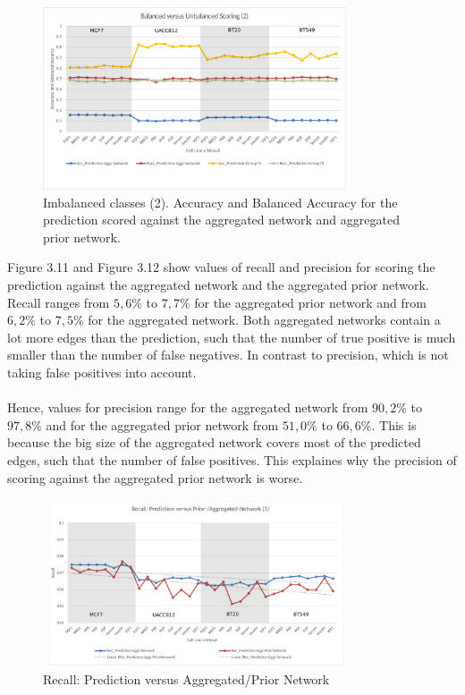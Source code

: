 \begin{figure}[H]
\captionsetup{width=0.8\linewidth}
\centering
\includegraphics[width=0.8\textwidth]{./Bilder/Scoring/dreamchallenge/1_Balanced_vs_Unbalanced/balanced2.pdf}
\caption[Imbalanced classes (2)]{Imbalanced classes (2). Accuracy and Balanced Accuracy for the prediction scored against the aggregated network and aggregated prior network.}
\label{fig:10}
\end{figure}

Figure 3.11 and Figure 3.12 show values of recall and precision for scoring the prediction against the aggregated network and the aggregated prior network. Recall ranges from $5,6\% $ to $7,7\% $ for the aggregated prior network and from $6,2\% $ to $7,5\% $ for the aggregated network. Both aggregated networks contain a lot more edges than the prediction, such that the number of true positive is much smaller than the number of false negatives. In contrast to precision, which is not taking false positives into account. \\\\

Hence, values for precision range for the aggregated network from $90,2\% $ to $97,8\% $ and for the aggregated prior network from $51,0\% $ to $66,6\% $. This is because the big size of the aggregated network covers most of the predicted edges, such that the number of false positives. This explaines why the precision of scoring against the aggregated prior network is worse. 

\begin{figure}[H]
\captionsetup{width=0.8\linewidth}
\centering
\includegraphics[width=0.8\textwidth]{./Bilder/Scoring/dreamchallenge/1_Balanced_vs_Unbalanced/balanced_rec_prec1.pdf}
\caption[Recall: Prediction versus Aggregated/Prior Network]{Recall: Prediction versus Aggregated/Prior Network}
\label{fig:10}
\end{figure}

